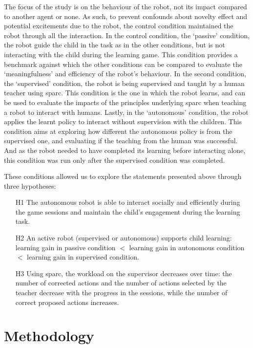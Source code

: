 The focus of the study is on the behaviour of the robot, not its impact compared to another agent or none. As such, to prevent confounds about novelty effect and potential excitements due to the robot, the control condition maintained the robot through all the interaction. In the control condition, the `passive' condition, the robot guide the child in the task as in the other conditions, but is not interacting with the child during the learning game. This condition provides a benchmark against which the other conditions can be compared to evaluate the `meaningfulness' and efficiency of the robot's behaviour. In the second condition, the `supervised' condition, the robot is being supervised and taught by a human teacher using \gls{sparc}. This condition is the one in which the robot learns, and can be used to evaluate the impacts of the principles underlying \gls{sparc} when teaching a robot to interact with humans. Lastly, in the `autonomous' condition, the robot applies the learnt policy to interact without supervision with the children. This condition aims at exploring how different the autonomous policy is from the supervised one, and evaluating if the teaching from the human was successful. And as the robot needed to have completed its learning before interacting alone, this condition was run only after the supervised condition was completed.

These conditions allowed us to explore the statements presented above through three hypotheses:
\begin{itemize}
	\item [H1] The autonomous robot is able to interact socially and efficiently during the game sessions and maintain the child's engagement during the learning task.
	\item [H2] An active robot (supervised or autonomous) supports child learning: learning gain in passive condition $<$ learning gain in autonomous condition $<$ learning gain in supervised condition.
	\item [H3] Using \gls{sparc}, the workload on the supervisor decreases over time: the number of corrected actions and the number of actions selected  by the teacher decrease with the progress in the sessions, while the number of correct proposed actions increases.
\end{itemize}

\section{Methodology}

